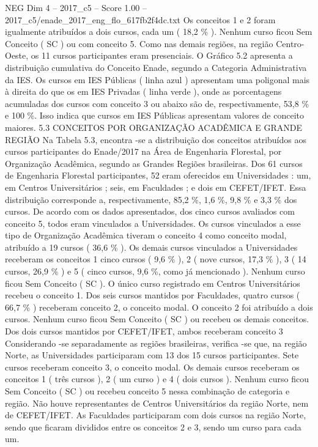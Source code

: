 \begin{textsample}{NEG Dim 4 – 2017\_c5 – Score 1.00 – 2017\_c5/enade\_2017\_eng\_flo\_617fb2f4dc.txt}
Os conceitos 1 e 2 foram igualmente atribuídos a dois cursos, cada um ( 18,2 \% ).
Nenhum curso ficou Sem Conceito ( SC ) ou com conceito 5.
Como nas demais regiões, na região Centro-Oeste, os 11 cursos participantes eram presenciais.
O Gráfico 5.2 apresenta a distribuição cumulativa do Conceito Enade, segundo a Categoria Administrativa da IES.
Os cursos em IES Públicas ( linha azul ) apresentam uma poligonal mais à direita do que os em IES Privadas ( linha verde ), onde as porcentagens acumuladas dos cursos com conceito 3 ou abaixo são de, respectivamente, 53,8 \% e 100 \%.
Isso indica que cursos em IES Públicas apresentam valores de conceito maiores. 5.3 CONCEITOS POR ORGANIZAÇÃO ACADÊMICA E GRANDE REGIÃO Na Tabela 5.3, encontra -se a distribuição dos conceitos atribuídos aos cursos participantes do Enade/2017 na Área de Engenharia Florestal, por Organização Acadêmica, segundo as Grandes Regiões brasileiras.
Dos 61 cursos de Engenharia Florestal participantes, 52 eram oferecidos em Universidades : um, em Centros Universitários ; seis, em Faculdades ; e dois em CEFET/IFET.
Essa distribuição corresponde a, respectivamente, 85,2 \%, 1,6 \%, 9,8 \% e 3,3 \% dos cursos.
De acordo com os dados apresentados, dos cinco cursos avaliados com conceito 5, todos eram vinculados a Universidades.
Os cursos vinculados a esse tipo de Organização Acadêmica tiveram o conceito 4 como conceito modal, atribuído a 19 cursos ( 36,6 \% ).
Os demais cursos vinculados a Universidades receberam os conceitos 1 cinco cursos ( 9,6 \% ), 2 ( nove cursos, 17,3 \% ), 3 ( 14 cursos, 26,9 \% ) e 5 ( cinco cursos, 9,6 \%, como já mencionado ).
Nenhum curso ficou Sem Conceito ( SC ).
O único curso registrado em Centros Universitários recebeu o conceito 1.
Dos seis cursos mantidos por Faculdades, quatro cursos ( 66,7 \% ) receberam conceito 2, o conceito modal.
O conceito 2 foi atribuído a dois cursos.
Nenhum curso ficou Sem Conceito ( SC ) ou recebeu os demais conceitos.
Dos dois cursos mantidos por CEFET/IFET, ambos receberam conceito 3 Considerando -se separadamente as regiões brasileiras, verifica -se que, na região Norte, as Universidades participaram com 13 dos 15 cursos participantes.
Sete cursos receberam conceito 3, o conceito modal.
Os demais cursos receberam os conceitos 1 ( três cursos ), 2 ( um curso ) e 4 ( dois cursos ).
Nenhum curso ficou Sem Conceito ( SC ) ou recebeu conceito 5 nessa combinação de categoria e região.
Não houve representantes de Centros Universitários da região Norte, nem de CEFET/IFET.
As Faculdades participaram com dois cursos na região Norte, sendo que ficaram divididos entre os conceitos 2 e 3, sendo um curso para cada um.

\end{textsample}

